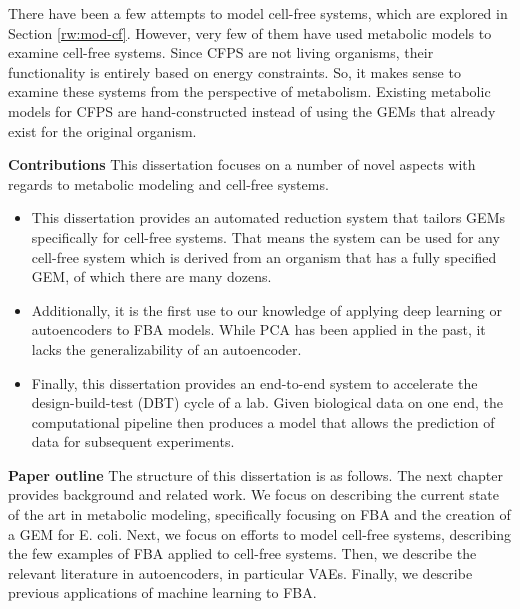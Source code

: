 There have been a few attempts to model cell-free systems, which are explored in Section \ref{rw:mod-cf}.
However, very few of them have used metabolic models to examine cell-free systems.
Since CFPS are not living organisms, their functionality is entirely based on energy constraints.
So, it makes sense to examine these systems from the perspective of metabolism.
Existing metabolic models for CFPS are hand-constructed instead of using the GEMs that already exist for the original organism.


\textbf{Contributions}
This dissertation focuses on a number of novel aspects with regards to metabolic modeling and cell-free systems.
\begin{itemize}
\item This dissertation provides an automated reduction system that tailors GEMs specifically for cell-free systems.
That means the system can be used for any cell-free system which is derived from an organism that has a fully specified GEM, of which there are many dozens.
\item Additionally, it is the first use to our knowledge of applying deep learning or autoencoders to FBA models.
While PCA has been applied in the past, it lacks the generalizability of an autoencoder.
\item Finally, this dissertation provides an end-to-end system to accelerate the design-build-test (DBT) cycle of a lab.
Given biological data on one end, the computational pipeline then produces a model that allows the prediction of data for subsequent experiments.
\end{itemize}

\textbf{Paper outline}
The structure of this dissertation is as follows.
The next chapter provides background and related work.
We focus on describing the current state of the art in metabolic modeling, specifically focusing on FBA and the creation of a GEM for E. coli.
Next, we focus on efforts to model cell-free systems, describing the few examples of FBA applied to cell-free systems.
Then, we describe the relevant literature in autoencoders, in particular VAEs.
Finally, we describe previous applications of machine learning to FBA.


